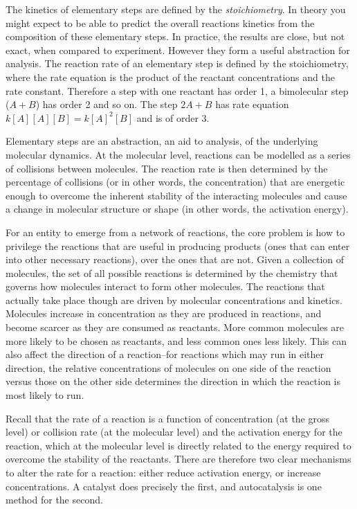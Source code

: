 The kinetics of elementary steps are defined by the \emph{stoichiometry}. In theory you might expect to be able to predict the overall reactions kinetics from the composition of these elementary steps. In practice, the results are close, but not exact, when compared to experiment. However they form a useful abstraction for analysis. The reaction rate of an elementary step is defined by the stoichiometry, where the rate equation is the product of the reactant concentrations and the rate constant. Therefore a step with one reactant has order 1, a bimolecular step (\(A + B\)) has order 2 and so on. The step \(2A + B\) has rate equation \(k[A][A][B] = k[A]^2[B]\) and is of order 3. 

Elementary steps are an abstraction, an aid to analysis, of the underlying molecular dynamics. At the molecular level, reactions can be
modelled as a series of collisions between molecules. The reaction rate is then determined by the percentage of collisions (or in other words,
the concentration) that are energetic enough to overcome the inherent stability of the interacting molecules and cause a change in molecular
structure or shape (in other words, the activation energy).

For an entity to emerge from a network of reactions, the core problem is how to privilege the reactions that are useful in producing products (ones that can enter into other necessary reactions), over the ones that are not. Given a collection of molecules, the set of all possible reactions is determined by the chemistry that governs how molecules interact to form other molecules. The reactions that actually take place though are driven by molecular concentrations and kinetics. Molecules increase in concentration as they are produced in reactions, and become scarcer as they are consumed as reactants. More common molecules are more likely to be chosen as reactants, and less common ones less likely. This can also affect the direction of a reaction--for reactions which may run in either direction, the relative concentrations of molecules on one side of the reaction versus those on the other side determines the direction in which the reaction is most likely to run.

Recall that the rate of a reaction is a function of concentration (at the gross level) or collision rate (at the molecular level) and the
activation energy for the reaction, which at the molecular level is directly related to the energy required to overcome the stability of the
reactants. There are therefore two clear mechanisms to alter the rate for a reaction: either reduce activation energy, or increase
concentrations. A catalyst does precisely the first, and autocatalysis is one method for the second.

